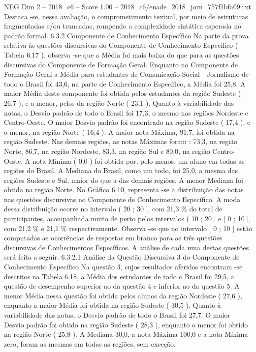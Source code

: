 \begin{textsample}{NEG Dim 2 – 2018\_c6 – Score 1.00 – 2018\_c6/enade\_2018\_jorn\_757f1bfa09.txt}
Destaca -se, nessa avaliação, o comprometimento textual, por meio de estruturas fragmentadas e/ou truncadas, rompendo a complexidade sintática esperada no padrão formal. 6.3.2 Componente de Conhecimento Específico Na parte da prova relativa às questões discursivas do Componente de Conhecimento Específico ( Tabela 6.17 ), observa -se que a Média foi mais baixa do que para as questões discursivas do Componente de Formação Geral.
Enquanto no Componente de Formação Geral a Média para estudantes de Comunicação Social - Jornalismo de todo o Brasil foi 43,6, na parte de Conhecimento Específico, a Média foi 25,8.
A maior Média deste componente foi obtida pelos estudantes da região Sudeste ( 26,7 ), e a menor, pelos da região Norte ( 23,1 ).
Quanto à variabilidade das notas, o Desvio padrão de todo o Brasil foi 17,3, o mesmo nas regiões Nordeste e Centro-Oeste.
O maior Desvio padrão foi encontrado na região Sudeste ( 17,4 ), e o menor, na região Norte ( 16,4 ).
A maior nota Máxima, 91,7, foi obtida na região Sudeste.
Nas demais regiões, as notas Máximas foram : 73,3, na região Norte, 86,7, na região Nordeste, 83,3, na região Sul e 80,0, na região Centro-Oeste.
A nota Mínima ( 0,0 ) foi obtida por, pelo menos, um aluno em todas as regiões do Brasil.
A Mediana do Brasil, como um todo, foi 25,0, a mesma das regiões Sudeste e Sul, maior do que a das demais regiões.
A menor Mediana foi obtida na região Norte.
No Gráfico 6.10, representa -se a distribuição das notas nas questões discursivas no Componente de Conhecimento Específico.
A moda dessa distribuição ocorre no intervalo ( 20 ; 30 ], com 21,3 \% do total de participantes, acompanhada muito de perto pelos intervalos ( 10 ; 20 ] e [ 0 ; 10 ], com 21,2 \% e 21,1 \% respectivamente.
Observa -se que no intervalo [ 0 ; 10 ] estão computadas as ocorrências de respostas em branco para as três questões discursivas de Conhecimentos Específicos.
A análise de cada uma destas questões será feita a seguir. 6.3.2.1 Análise da Questão Discursiva 3 do Componente de Conhecimento Específico Na questão 3, cujos resultados aferidos encontram -se descritos na Tabela 6.18, a Média dos estudantes de todo o Brasil foi 29,5, a questão de desempenho superior ao da questão 4 e inferior ao da questão 5.
A menor Média nessa questão foi obtida pelos alunos da região Nordeste ( 27,6 ), enquanto a maior Média foi obtida na região Sudeste ( 30,5 ).
Quanto à variabilidade das notas, o Desvio padrão de todo o Brasil foi 27,7.
O maior Desvio padrão foi obtido na região Sudeste ( 28,3 ), enquanto o menor foi obtido na região Norte ( 25,8 ).
A Mediana 30,0, a nota Máxima 100,0 e a nota Mínima zero, foram as mesmas em todas as regiões, sem exceção.

\end{textsample}
